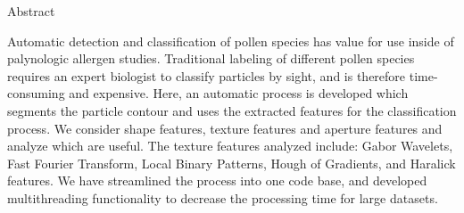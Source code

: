 Abstract\textbf{}


Automatic detection and classification of pollen species has value for use inside of palynologic allergen studies. Traditional labeling of different pollen species requires an expert biologist to classify particles by sight, and is therefore time-consuming and expensive. Here, an automatic process is developed which segments the particle contour and uses the extracted features for the classification process. We consider shape features, texture features and aperture features and analyze which are useful. The texture features analyzed include: Gabor Wavelets, Fast Fourier Transform, Local Binary Patterns, Hough of Gradients, and Haralick features. We have streamlined the process into one code base, and developed multithreading functionality to decrease the processing time for large datasets.
    
    
    
    